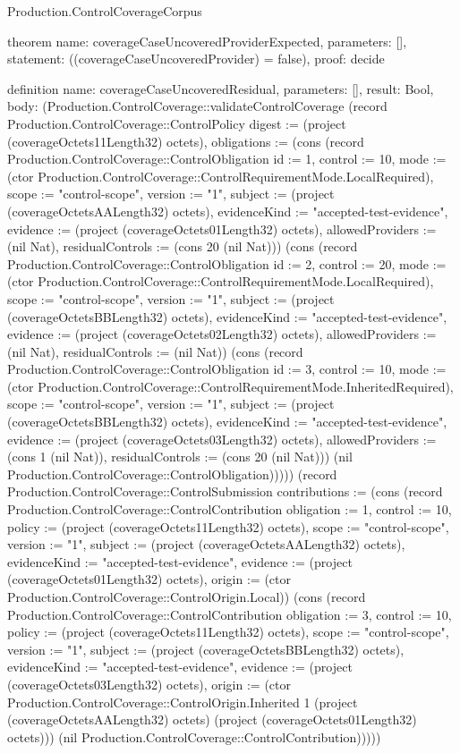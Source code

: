 \begin{lexlean}{Production.ControlCoverageCorpus}
\begin{semanticmodule}
theorem{
  name: coverageCaseUncoveredProviderExpected,
  parameters: [],
  statement: ((coverageCaseUncoveredProvider) = false),
  proof: decide{}
}

definition{
  name: coverageCaseUncoveredResidual,
  parameters: [],
  result: Bool,
  body: (Production.ControlCoverage::validateControlCoverage (record Production.ControlCoverage::ControlPolicy {digest := (project (coverageOctets11Length32) octets), obligations := (cons (record Production.ControlCoverage::ControlObligation {id := 1, control := 10, mode := (ctor Production.ControlCoverage::ControlRequirementMode.LocalRequired), scope := "control-scope", version := "1", subject := (project (coverageOctetsAALength32) octets), evidenceKind := "accepted-test-evidence", evidence := (project (coverageOctets01Length32) octets), allowedProviders := (nil Nat), residualControls := (cons 20 (nil Nat))}) (cons (record Production.ControlCoverage::ControlObligation {id := 2, control := 20, mode := (ctor Production.ControlCoverage::ControlRequirementMode.LocalRequired), scope := "control-scope", version := "1", subject := (project (coverageOctetsBBLength32) octets), evidenceKind := "accepted-test-evidence", evidence := (project (coverageOctets02Length32) octets), allowedProviders := (nil Nat), residualControls := (nil Nat)}) (cons (record Production.ControlCoverage::ControlObligation {id := 3, control := 10, mode := (ctor Production.ControlCoverage::ControlRequirementMode.InheritedRequired), scope := "control-scope", version := "1", subject := (project (coverageOctetsBBLength32) octets), evidenceKind := "accepted-test-evidence", evidence := (project (coverageOctets03Length32) octets), allowedProviders := (cons 1 (nil Nat)), residualControls := (cons 20 (nil Nat))}) (nil Production.ControlCoverage::ControlObligation))))}) (record Production.ControlCoverage::ControlSubmission {contributions := (cons (record Production.ControlCoverage::ControlContribution {obligation := 1, control := 10, policy := (project (coverageOctets11Length32) octets), scope := "control-scope", version := "1", subject := (project (coverageOctetsAALength32) octets), evidenceKind := "accepted-test-evidence", evidence := (project (coverageOctets01Length32) octets), origin := (ctor Production.ControlCoverage::ControlOrigin.Local)}) (cons (record Production.ControlCoverage::ControlContribution {obligation := 3, control := 10, policy := (project (coverageOctets11Length32) octets), scope := "control-scope", version := "1", subject := (project (coverageOctetsBBLength32) octets), evidenceKind := "accepted-test-evidence", evidence := (project (coverageOctets03Length32) octets), origin := (ctor Production.ControlCoverage::ControlOrigin.Inherited 1 (project (coverageOctetsAALength32) octets) (project (coverageOctets01Length32) octets))}) (nil Production.ControlCoverage::ControlContribution)))}))
}


\end{semanticmodule}
\end{lexlean}
